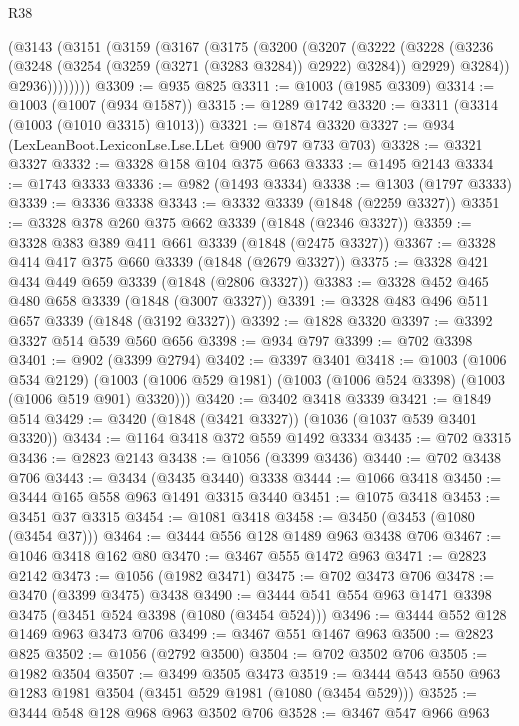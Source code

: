 \begin{lexlean}{R38}
\begin{coremodule}
      (@3143
        (@3151
          (@3159
            (@3167
              (@3175
                (@3200
                  (@3207
                    (@3222
                      (@3228
                        (@3236 (@3248 (@3254 (@3259 (@3271 (@3283 @3284)) @2922) @3284)) @2929)
                        @3284))
                    @2936))))))))
@3309 := @935 @825
@3311 := @1003 (@1985 @3309)
@3314 := @1003 (@1007 (@934 @1587))
@3315 := @1289 @1742
@3320 := @3311 (@3314 (@1003 (@1010 @3315) @1013))
@3321 := @1874 @3320
@3327 := @934 (LexLeanBoot.LexiconLse.Lse.LLet @900 @797 @733 @703)
@3328 := @3321 @3327
@3332 := @3328 @158 @104 @375 @663
@3333 := @1495 @2143
@3334 := @1743 @3333
@3336 := @982 (@1493 @3334)
@3338 := @1303 (@1797 @3333)
@3339 := @3336 @3338
@3343 := @3332 @3339 (@1848 (@2259 @3327))
@3351 := @3328 @378 @260 @375 @662 @3339 (@1848 (@2346 @3327))
@3359 := @3328 @383 @389 @411 @661 @3339 (@1848 (@2475 @3327))
@3367 := @3328 @414 @417 @375 @660 @3339 (@1848 (@2679 @3327))
@3375 := @3328 @421 @434 @449 @659 @3339 (@1848 (@2806 @3327))
@3383 := @3328 @452 @465 @480 @658 @3339 (@1848 (@3007 @3327))
@3391 := @3328 @483 @496 @511 @657 @3339 (@1848 (@3192 @3327))
@3392 := @1828 @3320
@3397 := @3392 @3327 @514 @539 @560 @656
@3398 := @934 @797
@3399 := @702 @3398
@3401 := @902 (@3399 @2794)
@3402 := @3397 @3401
@3418 := @1003
    (@1006 @534 @2129)
    (@1003 (@1006 @529 @1981) (@1003 (@1006 @524 @3398) (@1003 (@1006 @519 @901) @3320)))
@3420 := @3402 @3418 @3339
@3421 := @1849 @514
@3429 := @3420 (@1848 (@3421 @3327)) (@1036 (@1037 @539 @3401 @3320))
@3434 := @1164 @3418 @372 @559 @1492 @3334
@3435 := @702 @3315
@3436 := @2823 @2143
@3438 := @1056 (@3399 @3436)
@3440 := @702 @3438 @706
@3443 := @3434 (@3435 @3440) @3338
@3444 := @1066 @3418
@3450 := @3444 @165 @558 @963 @1491 @3315 @3440
@3451 := @1075 @3418
@3453 := @3451 @37 @3315
@3454 := @1081 @3418
@3458 := @3450 (@3453 (@1080 (@3454 @37)))
@3464 := @3444 @556 @128 @1489 @963 @3438 @706
@3467 := @1046 @3418 @162 @80
@3470 := @3467 @555 @1472 @963
@3471 := @2823 @2142
@3473 := @1056 (@1982 @3471)
@3475 := @702 @3473 @706
@3478 := @3470 (@3399 @3475) @3438
@3490 := @3444 @541 @554 @963 @1471 @3398 @3475 (@3451 @524 @3398 (@1080 (@3454 @524)))
@3496 := @3444 @552 @128 @1469 @963 @3473 @706
@3499 := @3467 @551 @1467 @963
@3500 := @2823 @825
@3502 := @1056 (@2792 @3500)
@3504 := @702 @3502 @706
@3505 := @1982 @3504
@3507 := @3499 @3505 @3473
@3519 := @3444 @543 @550 @963 @1283 @1981 @3504 (@3451 @529 @1981 (@1080 (@3454 @529)))
@3525 := @3444 @548 @128 @968 @963 @3502 @706
@3528 := @3467 @547 @966 @963

\end{coremodule}
\end{lexlean}
